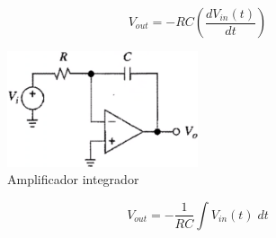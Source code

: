 \documentclass[12pt, letterpaper]{extarticle}
\begin{document}
\begin{equation*}
    V_{out} = -RC\left(\frac{dV_{in}(t)}{dt}\right)
\end{equation*}



\begin{figure}[h]
    \centering
    \includegraphics[width=0.5\textwidth]{Media/amplificador_integrador.png}
    \caption{Amplificador integrador}
    \label{Fig: Amplificador integrador}
\end{figure}

\begin{equation*}
    V_{out} = -\frac{1}{RC}\int V_{in}(t) \; dt
\end{equation*}
\end{document}
